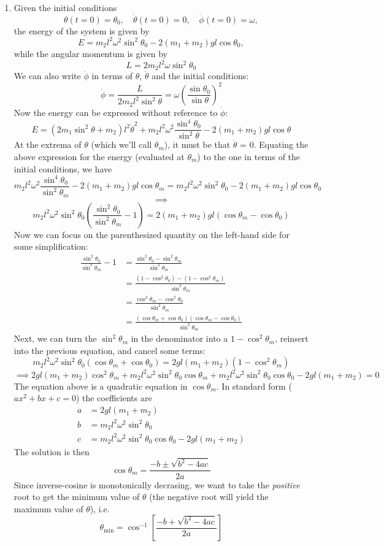 \documentclass[12pt]{article}
\begin{document}
\begin{enumerate}[label=(\alph*)]
    \item Given the initial conditions
    \[ \theta(t=0) = \theta_0, \quad \dot{\theta}(t=0) = 0, \quad \dot{\phi}(t=0) = \omega, \]
    the energy of the system is given by
    \[ E = m_2l^2\omega^2\sin^2\theta_0 - 2(m_1+m_2)gl\cos\theta_0, \]
    while the angular momentum is given by 
    \[ L = 2m_2l^2\omega\sin^2\theta_0 \]
    We can also write $\dot{\phi}$ in terms of $\theta$, $\dot{\theta}$ and the initial conditions:
    \[ \dot{\phi} = \frac{L}{2m_2l^2\sin^2\theta} = \omega\left(\frac{\sin\theta_0}{\sin\theta}\right)^2 \]
    Now the energy can be expressed without reference to $\dot{\phi}$:
    \[ E = (2m_1\sin^2\theta + m_2)l^2\dot{\theta}^2 + m_2l^2\omega^2\frac{\sin^4\theta_0}{\sin^2\theta} - 2(m_1+m_2)gl\cos\theta \]
    At the extrema of $\theta$ (which we'll call $\theta_m$), it must be that $\dot{\theta}$ = 0. Equating the above expression for the energy (evaluated at $\theta_m$) to the one in terms of the initial conditions, we have
    \[ m_2l^2\omega^2\frac{\sin^4\theta_0}{\sin^2\theta_m} - 2(m_1+m_2)gl\cos\theta_m = m_2l^2\omega^2\sin^2\theta_0 - 2(m_1+m_2)gl\cos\theta_0 \] 
    \[ \implies \]
    \[ m_2l^2\omega^2\sin^2\theta_0\left(\frac{\sin^2\theta_0}{\sin^2\theta_m} - 1\right) = 2(m_1+m_2)gl(\cos\theta_m - \cos\theta_0) \]
    Now we can focus on the parenthesized quantity on the left-hand side for some simplification:
    \begin{align*}
        \frac{\sin^2\theta_0}{\sin^2\theta_m} - 1 &= \frac{\sin^2\theta_0 - \sin^2\theta_m}{\sin^2\theta_m} \\
        &= \frac{(1 - \cos^2\theta_0)-(1 - \cos^2\theta_m)}{\sin^2\theta_m} \\
        &= \frac{\cos^2\theta_m - \cos^2\theta_0}{\sin^2\theta_m} \\
        &= \frac{(\cos\theta_m + \cos\theta_0)(\cos\theta_m - \cos\theta_0)}{\sin^2\theta_m}
    \end{align*}
    Next, we can turn the $\sin^2\theta_m$ in the denominator into a $1 - \cos^2\theta_m$, reinsert into the previous equation, and cancel some terms:
    \[ m_2l^2\omega^2\sin^2\theta_0(\cos\theta_m + \cos\theta_0) = 2gl(m_1+m_2)(1 - \cos^2\theta_m) \]
    \[ \implies 2gl(m_1+m_2)\cos^2\theta_m + m_2l^2\omega^2\sin^2\theta_0\cos\theta_m + m_2l^2\omega^2\sin^2\theta_0\cos\theta_0 - 2gl(m_1+m_2) = 0 \]
    The equation above is a quadratic equation in $\cos\theta_m$. In standard form ($ax^2 + bx + c = 0$) the coefficients are
    \begin{align*}
        a &= 2gl(m_1+m_2) \\
        b &= m_2l^2\omega^2\sin^2\theta_0 \\
        c &= m_2l^2\omega^2\sin^2\theta_0\cos\theta_0 - 2gl(m_1+m_2)
    \end{align*}
    The solution is then
    \[ \cos\theta_m = \frac{-b \pm \sqrt{b^2 -4ac}}{2a} \]
    Since inverse-cosine is monotonically decrasing, we want to take the \textit{positive} root to get the minimum value of $\theta$ (the negative root will yield the maximum value of $\theta$), i.e.
    \[ \boxed{\theta_\text{min} = \cos^{-1}\left[\frac{-b + \sqrt{b^2 -4ac}}{2a} \right]} \]


\end{enumerate}
\end{document}
